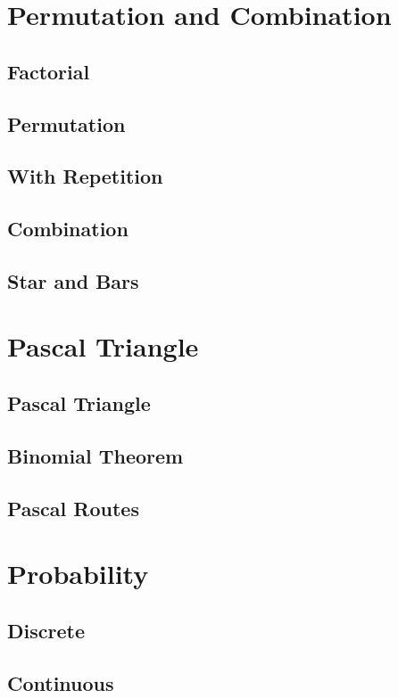 \documentclass{article}
\begin{document}
\section{Permutation and Combination}

\subsection{Factorial}

\subsection{Permutation}

\subsection{With Repetition}

\subsection{Combination}

\subsection{Star and Bars}

\section{Pascal Triangle}

\subsection{Pascal Triangle}

\subsection{Binomial Theorem}

\subsection{Pascal Routes}

\section{Probability}

\subsection{Discrete}

\subsection{Continuous}
\end{document}

